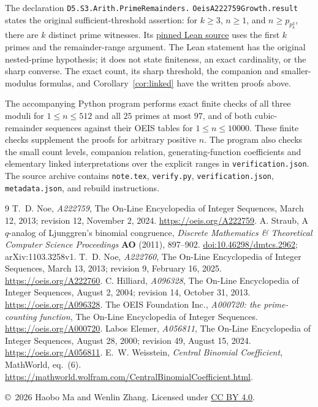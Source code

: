 \documentclass[11pt]{article}
\begin{document}
The declaration
\texttt{D5.S3.Arith.PrimeRemainders.}\allowbreak
\texttt{OeisA222759Growth.result}
states the original sufficient-threshold assertion: for $k\ge3$, $n\ge1$,
and $n\ge p_{p_k^3}$, there are $k$ distinct prime witnesses. Its
\href{https://github.com/the-omega-institute/trureturing/blob/3d781ae04219d5c99e87e82e3bbc3f6816e3691e/D5/S3/Arith/PrimeRemainders/OeisA222759Growth.lean}{pinned Lean source}
uses the first $k$ primes and the remainder-range argument.
The Lean statement has the original nested-prime hypothesis; it does not
state finiteness, an exact cardinality, or the sharp converse.
The exact count, its sharp threshold, the companion and smaller-modulus
formulas, and Corollary~\ref{cor:linked} have the written proofs above.

The accompanying Python program performs exact finite checks of all three
moduli for $1\le n\le512$ and all $25$ primes at most $97$, and of both
cubic-remainder sequences against their OEIS tables for $1\le n\le10000$.
These finite checks supplement the proofs for arbitrary positive $n$.
The program also checks the small count levels, companion relation,
generating-function coefficients and elementary linked interpretations
over the explicit ranges in \texttt{verification.json}.
The source archive contains \texttt{note.tex}, \texttt{verify.py},
\texttt{verification.json}, \texttt{metadata.json}, and rebuild instructions.

\begin{thebibliography}{9}
 T.~D. Noe, \emph{A222759}, The On-Line Encyclopedia of
Integer Sequences, March 12, 2013; revision 12, November 2, 2024.
\url{https://oeis.org/A222759}.
 A. Straub, A $q$-analog of Ljunggren's binomial congruence,
\emph{Discrete Mathematics \& Theoretical Computer Science Proceedings}
\textbf{AO} (2011), 897--902.
\href{https://doi.org/10.46298/dmtcs.2962}{doi:10.46298/dmtcs.2962};
arXiv:1103.3258v1.
 T.~D. Noe, \emph{A222760}, The On-Line Encyclopedia
of Integer Sequences, March 13, 2013; revision 9, February 16, 2025.
\url{https://oeis.org/A222760}.
 C. Hilliard, \emph{A096328}, The On-Line Encyclopedia
of Integer Sequences, August 2, 2004; revision 14, October 31, 2013.
\url{https://oeis.org/A096328}.
 The OEIS Foundation Inc., \emph{A000720: the prime-counting
function}, The On-Line Encyclopedia of Integer Sequences.
\url{https://oeis.org/A000720}.
 Labos Elemer, \emph{A056811}, The On-Line Encyclopedia of
Integer Sequences, August 28, 2000; revision 49, August 15, 2024.
\url{https://oeis.org/A056811}.
 E.~W. Weisstein, \emph{Central Binomial Coefficient},
MathWorld, eq.~(6).
\url{https://mathworld.wolfram.com/CentralBinomialCoefficient.html}.
\end{thebibliography}
\medskip\noindent\small
\copyright\ 2026 Haobo Ma and Wenlin Zhang.
Licensed under \href{https://creativecommons.org/licenses/by/4.0/}{CC BY 4.0}.
\end{document}
